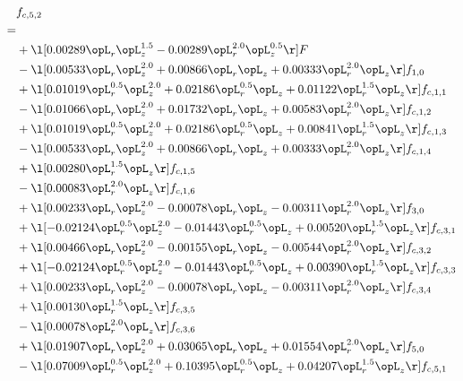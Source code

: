 \begin{alignat}{2} 
\label{eq:f_52_1} 
& f_{c,5,2} \nonumber \\ 
 = \\ 
& + \l[  0.00289 \opL_r \opL_z^{1.5}   -0.00289 \opL_r^{2.0} \opL_z^{0.5}  \r] F \nonumber \\ 
& - \l[  0.00533 \opL_r \opL_z^{2.0} +  0.00866 \opL_r \opL_z +  0.00333 \opL_r^{2.0} \opL_z  \r] f_{1,0} \nonumber \\ 
& + \l[  0.01019 \opL_r^{0.5} \opL_z^{2.0} +  0.02186 \opL_r^{0.5} \opL_z +  0.01122 \opL_r^{1.5} \opL_z  \r] f_{c,1,1} \nonumber \\ 
& - \l[  0.01066 \opL_r \opL_z^{2.0} +  0.01732 \opL_r \opL_z +  0.00583 \opL_r^{2.0} \opL_z  \r] f_{c,1,2} \nonumber \\ 
& + \l[  0.01019 \opL_r^{0.5} \opL_z^{2.0} +  0.02186 \opL_r^{0.5} \opL_z +  0.00841 \opL_r^{1.5} \opL_z  \r] f_{c,1,3} \nonumber \\ 
& - \l[  0.00533 \opL_r \opL_z^{2.0} +  0.00866 \opL_r \opL_z +  0.00333 \opL_r^{2.0} \opL_z  \r] f_{c,1,4} \nonumber \\ 
& + \l[  0.00280 \opL_r^{1.5} \opL_z  \r] f_{c,1,5} \nonumber \\ 
& - \l[  0.00083 \opL_r^{2.0} \opL_z  \r] f_{c,1,6} \nonumber \\ 
& + \l[  0.00233 \opL_r \opL_z^{2.0}   -0.00078 \opL_r \opL_z   -0.00311 \opL_r^{2.0} \opL_z  \r] f_{3,0} \nonumber \\ 
& + \l[  -0.02124 \opL_r^{0.5} \opL_z^{2.0}   -0.01443 \opL_r^{0.5} \opL_z +  0.00520 \opL_r^{1.5} \opL_z  \r] f_{c,3,1} \nonumber \\ 
& + \l[  0.00466 \opL_r \opL_z^{2.0}   -0.00155 \opL_r \opL_z   -0.00544 \opL_r^{2.0} \opL_z  \r] f_{c,3,2} \nonumber \\ 
& + \l[  -0.02124 \opL_r^{0.5} \opL_z^{2.0}   -0.01443 \opL_r^{0.5} \opL_z +  0.00390 \opL_r^{1.5} \opL_z  \r] f_{c,3,3} \nonumber \\ 
& + \l[  0.00233 \opL_r \opL_z^{2.0}   -0.00078 \opL_r \opL_z   -0.00311 \opL_r^{2.0} \opL_z  \r] f_{c,3,4} \nonumber \\ 
& + \l[  0.00130 \opL_r^{1.5} \opL_z  \r] f_{c,3,5} \nonumber \\ 
& - \l[  0.00078 \opL_r^{2.0} \opL_z  \r] f_{c,3,6} \nonumber \\ 
& + \l[  0.01907 \opL_r \opL_z^{2.0} +  0.03065 \opL_r \opL_z +  0.01554 \opL_r^{2.0} \opL_z  \r] f_{5,0} \nonumber \\ 
& - \l[  0.07009 \opL_r^{0.5} \opL_z^{2.0} +  0.10395 \opL_r^{0.5} \opL_z +  0.04207 \opL_r^{1.5} \opL_z  \r] f_{c,5,1} \nonumber \\ 

\end{alignat}
